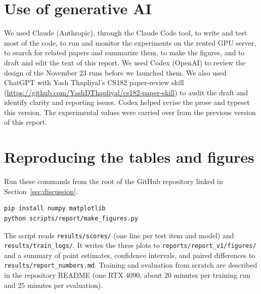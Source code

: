 \documentclass{article}
\begin{document}
\section{Use of generative AI}

We used Claude (Anthropic), through the Claude Code tool, to write and test most of the code, to run and monitor the experiments on the rented GPU server, to search for related papers and summarize them, to make the figures, and to draft and edit the text of this report. We used Codex (OpenAI) to review the design of the November 23 runs before we launched them. We also used ChatGPT with Yash Thapliyal's CS182 paper-review skill (\url{https://github.com/YashDThapliyal/cs182-paper-skill}) to audit the draft and identify clarity and reporting issues. Codex helped revise the prose and typeset this version. The experimental values were carried over from the previous version of this report.

\section{Reproducing the tables and figures}
Run these commands from the root of the GitHub repository linked in Section~\ref{sec:discussion}.

\begin{Verbatim}[fontsize=\small]
pip install numpy matplotlib
python scripts/report/make_figures.py
\end{Verbatim}
The script reads \texttt{results/scores/} (one line per test item and model) and \texttt{results/train\_logs/}. It writes the three plots to \texttt{reports/report\_v1/figures/} and a summary of point estimates, confidence intervals, and paired differences to \texttt{results/report\_numbers.md}. Training and evaluation from scratch are described in the repository README (one RTX 4090, about 20 minutes per training run and 25 minutes per evaluation).
\end{document}
